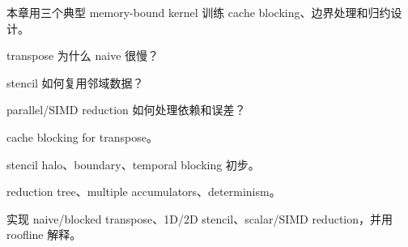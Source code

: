 {本章用三个典型 memory-bound kernel 训练 cache blocking、边界处理和归约设计。}
{\item transpose 为什么 naive 很慢？
\item stencil 如何复用邻域数据？
\item parallel/SIMD reduction 如何处理依赖和误差？}
{\item cache blocking for transpose。
\item stencil halo、boundary、temporal blocking 初步。
\item reduction tree、multiple accumulators、determinism。}
{实现 naive/blocked transpose、1D/2D stencil、scalar/SIMD reduction，并用 roofline 解释。}
